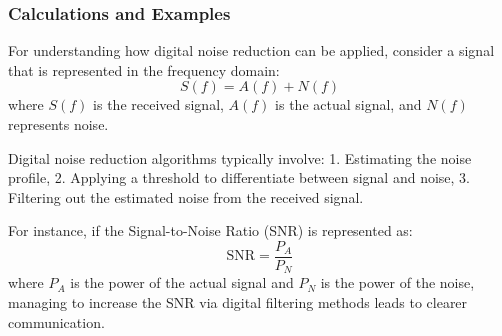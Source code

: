 \subsubsection{Calculations and Examples}

For understanding how digital noise reduction can be applied, consider a signal that is represented in the frequency domain:
\[
S(f) = A(f) + N(f)
\]
where \( S(f) \) is the received signal, \( A(f) \) is the actual signal, and \( N(f) \) represents noise. 

Digital noise reduction algorithms typically involve:
1. Estimating the noise profile,
2. Applying a threshold to differentiate between signal and noise,
3. Filtering out the estimated noise from the received signal.

For instance, if the Signal-to-Noise Ratio (SNR) is represented as:
\[
\text{SNR} = \frac{P_A}{P_N}
\]
where \( P_A \) is the power of the actual signal and \( P_N \) is the power of the noise, managing to increase the SNR via digital filtering methods leads to clearer communication.




